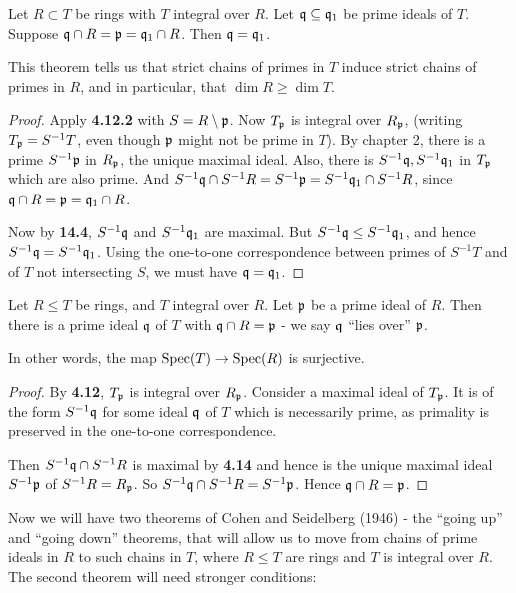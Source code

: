 \documentclass[10pt,a4paper]{article}
\begin{document}
\begin{theorem}
  Let $R \subset T$ be rings with $T$ integral over $R$. Let $\mathfrak{q} \subseteq \mathfrak{q}_1$ be prime ideals of $T$. Suppose $\mathfrak{q}\cap R = \mathfrak{p} = \mathfrak{q}_1 \cap R$. Then $\mathfrak{q}=\mathfrak{q}_1$.
\end{theorem}
This theorem tells us that strict chains of primes in $T$ induce strict chains of primes in $R$, and in particular, that $\dim R \geq \dim T$.
\begin{proof}
  Apply \textbf{4.12.2} with $S = R \setminus \mathfrak{p}$. Now $T_{\mathfrak{p}}$ is integral over $R_{\mathfrak{p}}$, (writing $T_{\mathfrak{p}} = S^{-1}T$, even though $\mathfrak{p}$ might not be prime in $T$). By chapter 2, there is a prime $S^{-1}\mathfrak{p}$ in $R_{\mathfrak{p}}$, the unique maximal ideal. Also, there is $S^{-1}\mathfrak{q}, S^{-1}\mathfrak{q}_1$ in $T_{\mathfrak{p}}$ which are also prime. And $S^{-1}\mathfrak{q}\cap S^{-1}R = S^{-1}\mathfrak{p} = S^{-1}\mathfrak{q}_1\cap S^{-1}R$, since $\mathfrak{q}\cap R =\mathfrak{p} = \mathfrak{q}_1 \cap R$.

  Now by \textbf{14.4}, $S^{-1}\mathfrak{q}$ and $S^{-1}\mathfrak{q}_1$ are maximal. But $S^{-1}\mathfrak{q} \leq S^{-1}\mathfrak{q}_1$, and hence $S^{-1}\mathfrak{q}= S^{-1}\mathfrak{q}_1$. Using the one-to-one correspondence between primes of $S^{-1}T$ and of $T$ not intersecting $S$, we must have $\mathfrak{q}=\mathfrak{q}_1$.
\end{proof}
\begin{theorem}
  Let $R \leq T$ be rings, and $T$ integral over $R$. Let $\mathfrak{p}$ be a prime ideal of $R$. Then there is a prime ideal $\mathfrak{q}$ of $T$ with $\mathfrak{q} \cap R =\mathfrak{p}$ - we say $\mathfrak{q}$ ``lies over'' $\mathfrak{p}$.

  In other words, the map $\operatorname{Spec}(T) \to \operatorname{Spec}(R)$ is surjective.
\end{theorem}
\begin{proof}
  By \textbf{4.12}, $T_{\mathfrak{p}}$ is integral over $R_{\mathfrak{p}}$. Consider a maximal ideal of $T_{\mathfrak{p}}$. It is of the form $S^{-1}\mathfrak{q}$ for some ideal $\mathfrak{q}$ of $T$ which is necessarily prime, as primality is preserved in the one-to-one correspondence.

  Then $S^{-1}\mathfrak{q} \cap S^{-1}R$ is maximal by \textbf{4.14} and hence is the unique maximal ideal $S^{-1}\mathfrak{p}$ of $S^{-1}R = R_{\mathfrak{p}}$. So $S^{-1}\mathfrak{q}\cap S^{-1}R = S^{-1}\mathfrak{p}$. Hence $\mathfrak{q}\cap R = \mathfrak{p}$.
\end{proof}
Now we will have two theorems of Cohen and Seidelberg (1946) - the ``going up'' and ``going down'' theorems, that will allow us to move from chains of prime ideals in $R$ to such chains in $T$, where $R\leq T$ are rings and $T$ is integral over $R$. The second theorem will need stronger conditions:
\end{document}
